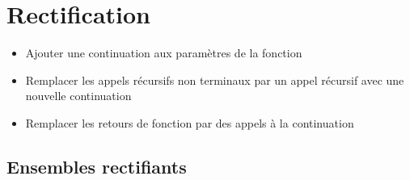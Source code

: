 \section{Rectification}

\begin{frame}
    \begin{itemize}
        \item Ajouter une continuation aux paramètres de la fonction
        \item Remplacer les appels récursifs non terminaux par un appel récursif
              avec une nouvelle continuation
        \item Remplacer les retours de fonction par des appels à la continuation
    \end{itemize}
\end{frame}

\subsection{Ensembles rectifiants}

